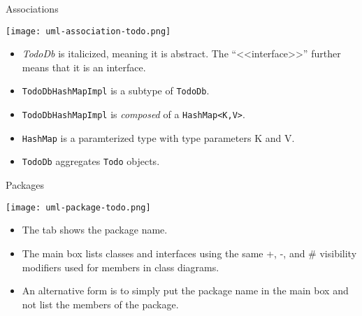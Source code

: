 \documentclass{beamer}
\begin{document}
\begin{frame}[fragile]{Associations}


\begin{center}
\texttt{[image: uml-association-todo.png]}
\end{center}

\begin{itemize}
\item {\it TodoDb} is italicized, meaning it is abstract.  The ``<<interface>>'' further means that it is an interface.
\item {\tt TodoDbHashMapImpl} is a subtype of {\tt TodoDb}.
\item {\tt TodoDbHashMapImpl} is {\it composed} of a {\tt HashMap<K,V>}.
\item {\tt HashMap} is a paramterized type with type parameters K and V.
\item {\tt TodoDb} aggregates {\tt Todo} objects.
\end{itemize}


\end{frame}

\begin{frame}[fragile]{Packages}


\begin{center}
\texttt{[image: uml-package-todo.png]}
\end{center}

\begin{itemize}
\item The tab shows the package name.
\item The main box lists classes and interfaces using the same +, -, and \# visibility modifiers used for members in class diagrams.
\item An alternative form is to simply put the package name in the main box and not list the members of the package.
\end{itemize}


\end{frame}
\end{document}
